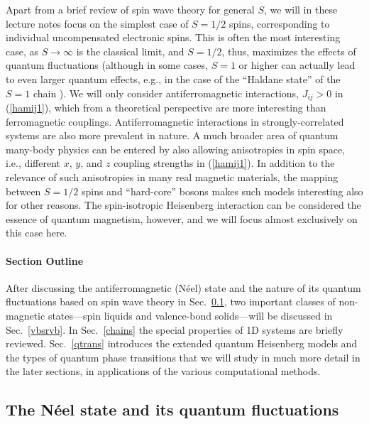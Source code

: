 \documentclass[draft,numberedheadings]{aipproc}
\begin{document}
Apart from a brief review of spin wave theory for general $S$, we will in these lecture notes focus on the simplest
case of $S=1/2$ spins, corresponding to individual uncompensated electronic spins. This is often the most interesting case, as $S \to \infty$ is the 
classical limit, and $S=1/2$, thus, maximizes the effects of quantum fluctuations (although in some cases, $S=1$ or higher can actually lead to even 
larger quantum effects, e.g., in the case of the ``Haldane state'' of the $S=1$ chain \cite{aklt}). We will only consider antiferromagnetic interactions, 
$J_{ij}>0$ in (\ref{hamij1}), which from a theoretical perspective are more interesting than ferromagnetic couplings. Antiferromagnetic interactions
in strongly-correlated systems are also more prevalent in nature. A much broader area of quantum many-body physics can be entered by also allowing 
anisotropies in spin space, i.e., different $x$, $y$, and $z$ coupling strengths in (\ref{hamij1}). In addition to the relevance of such anisotropies 
in many real magnetic materials, the mapping between $S=1/2$ spins and ``hard-core'' bosons makes such models interesting also for other reasons. 
The spin-isotropic Heisenberg interaction can be considered the essence of quantum magnetism, however, and we will focus almost exclusively on this 
case here.

\paragraph{Section Outline}

After discussing the antiferromagnetic (N\'eel) state and the nature of its quantum fluctuations based on spin wave theory in Sec.~\ref{neel}, two important 
classes of non-magnetic states---spin liquids and valence-bond solids---will be discussed in Sec.~\ref{vbsrvb}. In Sec.~\ref{chains} the special properties 
of 1D systems are briefly reviewed. Sec.~\ref{qtrans} introduces the extended quantum Heisenberg models and the types of quantum phase transitions 
that we will study in much more detail in the later sections, in applications of the various computational methods.

\subsection{The N\'eel state and its quantum fluctuations}
\label{neel}
\end{document}
